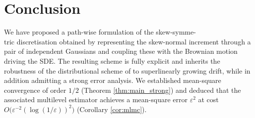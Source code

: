 \documentclass[11pt]{article}
\begin{document}



\section{Conclusion} We have proposed a path-wise formulation of the skew-symme-\\
tric discretisation obtained by representing the skew-normal increment through a pair of independent Gaussians and coupling these with the Brownian motion driving the SDE. The resulting scheme is fully explicit and inherits the robustness of the distributional scheme of \cite{skew:ima} to superlinearly growing drift, while in addition admitting a strong error analysis. We established mean-square convergence of order $1/2$ (Theorem \ref{thm:main_strong}) and deduced that the associated multilevel estimator achieves a mean-square error $\varepsilon^2$ at cost $O\big(\varepsilon^{-2}(\log(1/\varepsilon))^2\big)$ (Corollary \ref{cor:mlmc}).
\end{document}

